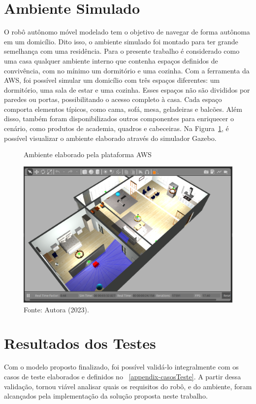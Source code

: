 \section{Ambiente Simulado}
O robô autônomo móvel modelado tem o objetivo de navegar de forma autônoma em um domicílio. Dito isso, o ambiente simulado foi montado para ter grande semelhança com uma residência. Para o presente trabalho é considerado como uma casa qualquer ambiente interno que contenha espaços definidos de convivência, com no mínimo um dormitório e uma cozinha. Com a ferramenta da AWS, foi possível simular um domicílio com três espaços diferentes: um dormitório, uma sala de estar e uma cozinha. Esses espaços não são divididos por paredes ou portas, possibilitando o acesso completo à casa. Cada espaço comporta elementos típicos, como cama, sofá, mesa, geladeiras e balcões. Além disso, também foram disponibilizados outros componentes para enriquecer o cenário, como produtos de academia, quadros e cabeceiras. Na Figura~\ref{fig:ambiente}, é possível visualizar o ambiente elaborado através do simulador Gazebo.

\begin{figure}[H]
    \centering
    \caption{Ambiente elaborado pela plataforma AWS}
    \includegraphics[scale=0.4]{ambiente.png}
    \caption*{Fonte: Autora (2023).}
    \label{fig:ambiente}
\end{figure}

\section{Resultados dos Testes}
Com o modelo proposto finalizado, foi possível validá-lo integralmente com os casos de teste elaborados e definidos no \appendixautorefname~\ref{appendix-casosTeste}. A partir dessa validação, tornou viável analisar quais os requisitos do robô, e do ambiente, foram alcançados pela implementação da solução proposta neste trabalho.

